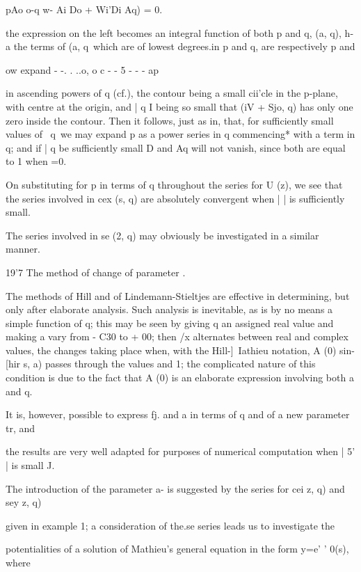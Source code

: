 {{pAo o-q w- Ai Do + Wi'Di Aq) = 0.

%
%

the expression on the left becomes an integral function of both p and
q, (a, q), h-a\; the terms of (a, q\ which are of lowest degrees.in p
and q, are respectively p and

 ow expand - -. . ..o, o c - - 5 - - - ap

in ascending powers of q (cf.), the contour being a small
cii'cle in the p-plane, with centre at the origin, and | q I being so
small that (iV + Sjo, q) has only one zero inside the contour. Then it
follows, just as in, that, for sufficiently small values of \
q\, we may expand p as a power series in q commencing* with a term in
q; and if | q be sufficiently small D and Aq will not vanish, since
both are equal to 1 when =0.

On substituting for p in terms of q throughout the series for U (z),
we see that the series involved in cex (s, q) are absolutely
convergent when | | is sufficiently small.

The series involved in se (2, q) may obviously be investigated in a
similar manner.

19'7 The method of change of parameter .

The methods of Hill and of Lindemann-Stieltjes are effective in
determining, but only after elaborate analysis. Such analysis is
inevitable, as is by no means a simple function of q; this may be
seen by giving q an assigned real value and making a vary from - C30
to + 00; then /x alternates between real and complex values, the
changes taking place when, with the Hill-]\ Iathieu notation, A (0)
sin- [hir s, a) passes through the values and 1; the complicated
nature of this condition is due to the fact that A (0) is an elaborate
expression involving both a and q.

It is, however, possible to express fj. and a in terms of q and of a
new parameter tr, and

the results are very well adapted for purposes of numerical
computation when | 5' | is small J.

The introduction of the parameter a- is suggested by the series for
cei z, q) and sey z, q)

given in example 1; a consideration of the.se series leads us
to investigate the

potentialities of a solution of Mathieu's general equation in the form
y=e' ' 0(s), where

}}
